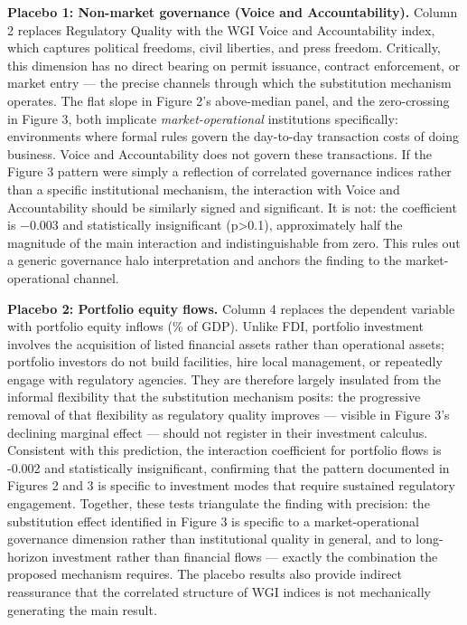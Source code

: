 \documentclass[
  12pt,
  letterpaper,
  DIV=11,
  numbers=noendperiod]{scrartcl}
\begin{document}
\textbf{Placebo 1: Non-market governance (Voice and Accountability).}
Column 2 replaces Regulatory Quality with the WGI Voice and
Accountability index, which captures political freedoms, civil
liberties, and press freedom. Critically, this dimension has no direct
bearing on permit issuance, contract enforcement, or market entry ---
the precise channels through which the substitution mechanism operates.
The flat slope in Figure 2's above-median panel, and the zero-crossing
in Figure 3, both implicate \emph{market-operational} institutions
specifically: environments where formal rules govern the day-to-day
transaction costs of doing business. Voice and Accountability does not
govern these transactions. If the Figure 3 pattern were simply a
reflection of correlated governance indices rather than a specific
institutional mechanism, the interaction with Voice and Accountability
should be similarly signed and significant. It is not: the coefficient
is −0.003 and statistically insignificant (p\textgreater0.1),
approximately half the magnitude of the main interaction and
indistinguishable from zero. This rules out a generic governance halo
interpretation and anchors the finding to the market-operational
channel.

\textbf{Placebo 2: Portfolio equity flows.} Column 4 replaces the
dependent variable with portfolio equity inflows (\% of GDP). Unlike
FDI, portfolio investment involves the acquisition of listed financial
assets rather than operational assets; portfolio investors do not build
facilities, hire local management, or repeatedly engage with regulatory
agencies. They are therefore largely insulated from the informal
flexibility that the substitution mechanism posits: the progressive
removal of that flexibility as regulatory quality improves --- visible
in Figure 3's declining marginal effect --- should not register in their
investment calculus. Consistent with this prediction, the interaction
coefficient for portfolio flows is -0.002 and statistically
insignificant, confirming that the pattern documented in Figures 2 and 3
is specific to investment modes that require sustained regulatory
engagement. Together, these tests triangulate the finding with
precision: the substitution effect identified in Figure 3 is specific to
a market-operational governance dimension rather than institutional
quality in general, and to long-horizon investment rather than financial
flows --- exactly the combination the proposed mechanism requires. The
placebo results also provide indirect reassurance that the correlated
structure of WGI indices is not mechanically generating the main result.
\end{document}
